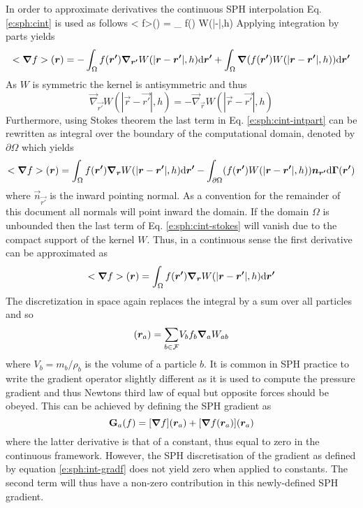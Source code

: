 \documentclass{../GPUSPHtemplate}
\begin{document}
In order to approximate derivatives the continuous SPH interpolation Eq.
\eqref{e:sph:cint} is used as follows
\be
<\vec{\nabla} f>() = \int_\Omega \vec{\nabla} f() W(|-|,h) \td {}
\label{e:sph:cint-gradf-start}
\en
Applying integration by parts yields
\begin{equation}
<\bm{\nabla} f>(\bm{r}) = - \int_\Omega f(\bm{r'}) \bm{\nabla}_{\bm{r'}} W(|\bm{r}-\bm{r'}|,h) \text{d} \bm{r'} +
\int_\Omega \bm{\nabla} (f(\bm{r'}) W(|\bm{r}-\bm{r'}|,h)) \text{d} \bm{r'}
\label{e:sph:cint-intpart}
\end{equation}
As $W$ is symmetric the kernel is antisymmetric and thus
\begin{equation}
\vec{\nabla}_{\vec{r'}} W(|\vec{r}-\vec{r'}|,h) = - \vec{\nabla}_{\vec{r}} W(|\vec{r}-\vec{r'}|,h)
\label{e:sph:kernel-asym} \end{equation}
Furthermore, using Stokes
theorem the last term in Eq. \eqref{e:sph:cint-intpart} can be rewritten
as integral over the boundary of the computational domain, denoted by
$\partial \Omega$ which yields
\begin{equation}
<\bm{\nabla} f>(\bm{r}) = \int_\Omega f(\bm{r'}) \bm{\nabla}_{\bm{r}} W(|\bm{r}-\bm{r'}|,h) \text{d} \bm{r'} -
\int_{\partial\Omega} (f(\bm{r'}) W(|\bm{r}-\bm{r'}|,h)) \bm{n}_{\bm{r'}} \text{d} \bm{\Gamma}(\bm{r'})
\label{e:sph:cint-stokes}
\end{equation}
where $\vec{n}_{\vec{r'}}$ is the inward pointing normal. As a convention for
the remainder of this document all normals will point inward the domain.
If the domain $\Omega$ is unbounded then the last term of Eq.
\eqref{e:sph:cint-stokes} will vanish due to the compact support of the
kernel $W$. Thus, in a continuous sense the first derivative can be
approximated as
\begin{equation}
<\bm{\nabla} f>(\bm{r}) = \int_\Omega f(\bm{r'}) \bm{\nabla}_{\bm{r}} W(|\bm{r}-\bm{r'}|,h) \text{d} \bm{r'}
\label{e:sph:cint-gradf}
\end{equation}
The discretization in space again replaces the integral by a sum over
all particles and so
\begin{equation}
[\vec{\nabla} f](\vec{r}_a) = \sumF V_b f_b \vec{\nabla}_a W_{ab}
\label{e:sph:int-gradf}
\end{equation}
where $V_b = m_b/\rho_b$ is the volume of a particle $b$. It is common
in SPH practice to write the gradient operator slightly different as it
is used to compute the pressure gradient and thus Newtons third law of
equal but opposite forces should be obeyed. This can be achieved by
defining the SPH gradient as
\begin{equation}
\textbf{G}_a(f) = [\bm{\nabla} f](\bm{r}_a) + [\bm{\nabla} f(\bm{r}_a)](\bm{r}_a)
\label{e:sph:grad-def}
\end{equation}
where the latter derivative is that of a constant, thus equal to zero in the
continuous framework. However, the SPH discretisation of the
gradient as defined by equation \eqref{e:sph:int-gradf} does not
yield zero when applied to constants. 
The second term will thus have a non-zero contribution in this newly-defined
SPH gradient.
\end{document}
